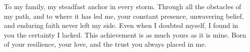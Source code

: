 
%

\begin{ntdedicatory}

To my family, my steadfast anchor in every storm.
Through all the obstacles of my path, and to where it has led me, your constant presence, unwavering belief, and enduring faith never left my side.
Even when I doubted myself, I found in you the certainty I lacked.
This achievement is as much yours as it is mine. Born of your resilience, your love, and the trust you always placed in me.

\end{ntdedicatory}